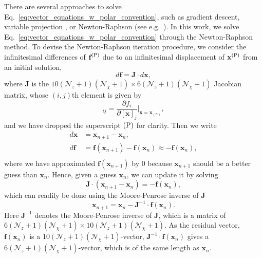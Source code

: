 \documentclass[aps,prx,amsmath,floats,floatfix,twocolumn,
  superscriptaddress,nofootinbib,showpacs]{revtex4-1}
\begin{document}
There are several approaches to solve Eq.~\eqref{eq:vector_equations_w_polar_convention}, such as gradient descent, variable projection \cite{varpro}, or Newton-Raphson (see e.g.~\cite{Dias:2015nua}). 
In this work, we solve Eq.~\eqref{eq:vector_equations_w_polar_convention} through the Newton-Raphson method. 
To devise the Newton-Raphson iteration procedure, we consider the infinitesimal differences of $\textbf{f}^{\rm (P)} $ due to an infinitesimal displacement of $\textbf{x}^{\rm (P)}$ from an initial solution, 
\begin{equation}
d \textbf{f} = \textbf{J} \cdot d \textbf{x},  
\end{equation}
where $\textbf{J}$ is the $10 (\mathcal{N}_{z}+1)(\mathcal{N}_{\chi}+1) \times 6 (\mathcal{N}_{z}+1)(\mathcal{N}_{\chi}+1)$ Jacobian matrix, whose $(i,j)$th element is given by 
\begin{equation}
[\textbf{J}]_{ij} = \frac{\partial f_i}{\partial [\textbf{x}]_{j}} \Bigg|_{\textbf{x} = \textbf{x}_{(n)}}, 
\end{equation}
and we have dropped the superscript $\rm (P)$ for clarity. 
Then we write 
\begin{equation}
\begin{split}
d \textbf{x} & = \textbf{x}_{n+1} - \textbf{x}_{n}, \\
d \textbf{f} & = \textbf{f}(\textbf{x}_{n+1}) - \textbf{f}(\textbf{x}_{n}) \approx - \textbf{f} (\textbf{x}_{n}),   \\
\end{split}
\end{equation}
where we have approximated $\textbf{f}(\textbf{x}_{n+1})$ by 0 because $\textbf{x}_{n+1}$ should be a better guess than $\textbf{x}_{n}$. 
Hence, given a guess $\textbf{x}_{n}$, we can update it by solving 
\begin{equation}
\textbf{J} \cdot \left( \textbf{x}_{n+1} - \textbf{x}_{n} \right) = - \textbf{f}(\textbf{x}_{n}), 
\end{equation}
which can readily be done using the Moore-Penrose inverse of $\textbf{J}$
\begin{equation}
\textbf{x}_{n+1} = \textbf{x}_{n} - \textbf{J}^{-1} \cdot \textbf{f}(\textbf{x}_{n}). 
\end{equation}
Here $\textbf{J}^{-1}$ denotes the Moore-Penrose inverse of $\textbf{J} $, which is a matrix of $6 (\mathcal{N}_{z}+1)(\mathcal{N}_{\chi}+1) \times 10 (\mathcal{N}_{z}+1)(\mathcal{N}_{\chi}+1)$. 
As the residual vector, $\textbf{f}(\textbf{x}_{n})$ is a $10 (\mathcal{N}_{z}+1)(\mathcal{N}_{\chi}+1)$-vector, $\textbf{J}^{-1} \cdot \textbf{f}(\textbf{x}_{n})$ gives a $6 (\mathcal{N}_{z}+1)(\mathcal{N}_{\chi}+1)$-vector, which is of the same length as $\textbf{x}_{n}$. 
\end{document}
